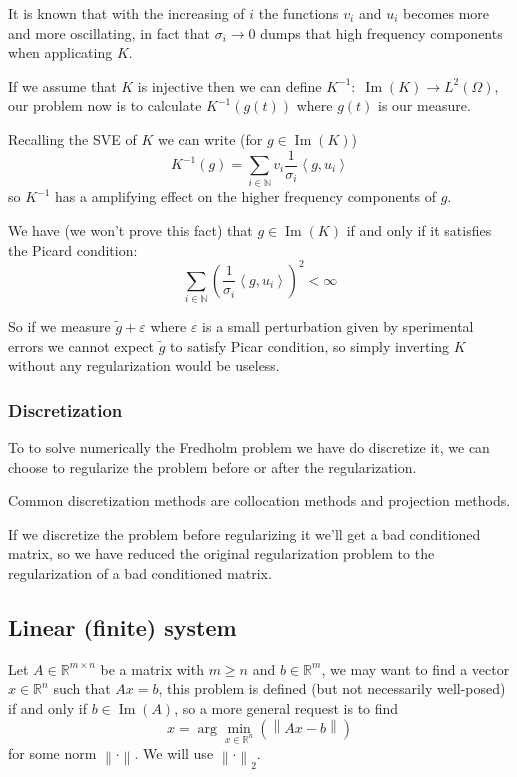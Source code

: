 \documentclass[a4paper,10pt]{article}
\theoremstyle{plain}
\theoremstyle{definition}
\theoremstyle{remark}
\newcommand{\pa}[1]{\left(#1\right)}
\newcommand{\ang}[1]{\left<#1\right>}
\newcommand{\norm}[1]{\left\|#1\right\|}
\DeclareMathOperator{\im}{Im}
\begin{document}
It is known that with the increasing of $i$ the functions $v_i$ and
$u_i$ becomes more and more oscillating, in fact that $\sigma _i \to
0$ dumps that high frequency components when applicating $K$.


If we assume that $K$ is injective then we can define $K^{-1}:\;
\im(K) \to L^2(\Omega)$, our problem now is to calculate
$K^{-1}(g(t))$ where $g(t)$ is our measure.

Recalling the SVE of $K$ we can write (for $g\in \im(K)$)
\begin{equation}
  \label{eq:inverseSVE}
  K^{-1}(g) = \sum _{i\in \mathbb{N}} v_i \frac{1}{\sigma _i} \ang{g,u_i}
\end{equation}
so $K^{-1}$ has a amplifying effect on the higher frequency components
of $g$.

We have (we won't prove this fact) that $g\in \im (K)$ if and only if
it satisfies the Picard condition:
\[ \sum _{i\in \mathbb{N}} \pa{ \frac{1}{\sigma _i} \ang{g,u_i}} ^2 <
\infty \] 

So if we measure $\tilde g + \varepsilon$ where $\varepsilon$ is a
small perturbation given by sperimental errors we cannot expect
$\tilde g$ to satisfy Picar condition, so simply inverting $K$ without
any regularization would be useless.


\subsubsection{Discretization}
\label{sec:fredholmdiscretization}

To to solve numerically the Fredholm problem we have do discretize it,
we can choose to regularize the problem before or after the
regularization.

Common discretization methods are collocation methods and projection
methods.

If we discretize the problem before regularizing it we'll get a bad
conditioned matrix, so we have reduced the original regularization
problem to the regularization of a bad conditioned matrix.

\subsection{Linear (finite) system}
\label{sec:exmatrix}

Let $A\in \mathbb{R}^{m \times n}$ be a matrix with $m \ge n$ and $b
\in \mathbb{R}^m$, we may want to find a vector $x \in \mathbb{R}^n$
such that $Ax = b$, this problem is defined (but not necessarily
well-posed) if and only if $b\in \im (A)$, so a more general request
is to find
\begin{equation}
  \label{eq:minxunreg}
  x = \arg\min _{x\in \mathbb{R}^n} \pa{ \norm{Ax -b} }
\end{equation}
for some norm $\norm{\cdot}$. We will use $\norm{\cdot}_2$.
\end{document}
